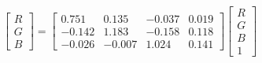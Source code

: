 \begin{equation}
\begin{bmatrix}
  R \\ G \\ B 
\end{bmatrix}=
\left[\begin{matrix}0.751 & 0.135 & -0.037 & 0.019\\ 
-0.142 & 1.183 & -0.158 & 0.118\\ 
-0.026 & -0.007 & 1.024 & 0.141\end{matrix}\right]
\begin{bmatrix}
  R \\ G \\ B \\ 1 
\end{bmatrix}
\end{equation}
